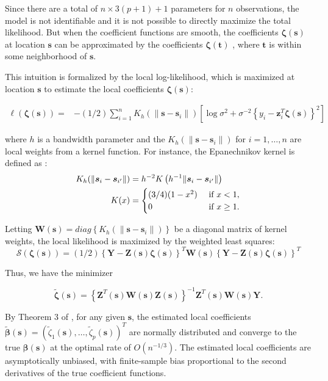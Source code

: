 \documentclass[authoryear,review, 12pt]{elsarticle}
\begin{document}
Since there are a total of $n\times3(p+1)+1$ parameters for $n$
observations, the model is not identifiable and it is not possible
to directly maximize the total likelihood. But when the coefficient
functions are smooth, the coefficients $\bm{\zeta}\left(\bm{s}\right)$
at location $\bm{s}$ can be approximated by the coefficients $\bm{\zeta}\left(\bm{t}\right)$
, where $\bm{t}$ is within some neighborhood of $\bm{s}$.

This intuition is formalized by the local log-likelihood, which is
maximized at location $\bm{s}$ to estimate the local coefficients
$\bm{\zeta}(\bm{s})$:

\begin{align}
\ell\left(\bm{\zeta}(\bm{s})\right)= & -(1/2)\sum_{i=1}^{n}K_{h}(\|\bm{s}-\bm{s}_{i}\|)\left[\log\sigma^{2}+\sigma^{-2}\left\{ y_{i}-\bm{z}_{i}^{T}\bm{\zeta}\left(\bm{s}\right)\right\} ^{2}\right]\label{eq:local-log-likelihood}
\end{align}


where $h$ is a bandwidth parameter and the $K_{h}\left(\|\bm{s}-\bm{s}_{i}\|\right)$
for $i=1,\dots,n$ are local weights from a kernel function. For instance,
the Epanechnikov kernel is defined as \citep{Samiuddin-el-Sayyad-1990}:
\begin{align}
K_{h}(\|\bm{s}_{i}-\bm{s}_{i'}\|) & =h^{-2}K\left(h^{-1}\|\bm{s}_{i}-\bm{s}_{i'}\|\right)\notag\label{eq:epanechnikov}\\
K(x) & =\begin{cases}
(3/4)(1-x^{2}) & \mbox{ if }x<1,\\
0 & \mbox{ if }x\geq1.
\end{cases}
\end{align}


Letting $\bm{W}(\bm{s})=diag\left\{ K_{h}(\|\bm{s}-\bm{s}_{i}\|)\right\} $
be a diagonal matrix of kernel weights, the local likelihood is maximized
by the weighted least squares: 
\[
\mathcal{S}\left(\bm{\zeta}\left(\bm{s}\right)\right)=(1/2)\left\{ \bm{Y}-\bm{Z}(\bm{s})\bm{\zeta}(\bm{s})\right\} ^{T}\bm{W}(\bm{s})\left\{ \bm{Y}-\bm{Z}(\bm{s})\bm{\zeta}(\bm{s})\right\} ^{T}
\]


Thus, we have the minimizer

\begin{equation}
\tilde{\bm{\zeta}}(\bm{s})=\left\{ \bm{Z}^{T}(\bm{s})\bm{W}(\bm{s})\bm{Z}(\bm{s})\right\} ^{-1}\bm{Z}^{T}(\bm{s})\bm{W}(\bm{s})\bm{Y}.\label{eq:zeta-hat}
\end{equation}


By Theorem 3 of \citet{Sun-Yan-Zhang-Lu-2014}, for any given $\bm{s}$,
the estimated local coefficients $\tilde{\bm{\beta}}\left(\bm{s}\right)=\left(\tilde{\zeta}_{1}\left(\bm{s}\right),\dots,\tilde{\zeta}_{p}\left(\bm{s}\right)\right)^{T}$
are normally distributed and converge to the true $\bm{\beta}\left(\bm{s}\right)$
at the optimal rate of $O\left(n^{-1/3}\right)$. The estimated local
coefficients are asymptotically unbiased, with finite-sample bias
proportional to the second derivatives of the true coefficient functions.
\end{document}

